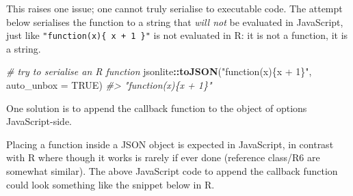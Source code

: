 \documentclass[
  10pt,
]{krantz}
\makeatletter
\newenvironment{Shaded}{\begin{snugshade}}{\end{snugshade}}
\newcommand{\CommentTok}[1]{\textcolor[rgb]{0.37,0.37,0.37}{\textit{#1}}}
\newcommand{\ControlFlowTok}[1]{\textcolor[rgb]{0.27,0.27,0.27}{\textbf{#1}}}
\newcommand{\DataTypeTok}[1]{\textcolor[rgb]{0.27,0.27,0.27}{#1}}
\newcommand{\KeywordTok}[1]{\textcolor[rgb]{0.27,0.27,0.27}{\textbf{#1}}}
\newcommand{\NormalTok}[1]{#1}
\newcommand{\OperatorTok}[1]{\textcolor[rgb]{0.43,0.43,0.43}{\textbf{#1}}}
\newcommand{\OtherTok}[1]{\textcolor[rgb]{0.37,0.37,0.37}{#1}}
\newcommand{\StringTok}[1]{\textcolor[rgb]{0.5,0.5,0.5}{#1}}
\newenvironment{kframe}{%
\medskip{}
\setlength{\fboxsep}{.8em}
 \def\at@end@of@kframe{}%
 \ifinner\ifhmode%
  \def\at@end@of@kframe{\end{minipage}}%
  \begin{minipage}{\columnwidth}%
 \fi\fi%
 \def\FrameCommand##1{\hskip\@totalleftmargin \hskip-\fboxsep
 \colorbox{shadecolor}{##1}\hskip-\fboxsep
     \hskip-\linewidth \hskip-\@totalleftmargin \hskip\columnwidth}%
 \MakeFramed {\advance\hsize-\width
   \@totalleftmargin\z@ \linewidth\hsize
   \@setminipage}}%
 {\par\unskip\endMakeFramed%
 \at@end@of@kframe}
\renewenvironment{Shaded}{\begin{kframe}}{\end{kframe}}
\makeatother
\begin{document}
This raises one issue; one cannot truly serialise to executable code. The attempt below serialises the function to a string that \emph{will not} be evaluated in JavaScript, just like \texttt{"function(x)\{\ x\ +\ 1\ \}"} is not evaluated in R: it is not a function, it is a string.

\begin{Shaded}
\begin{Highlighting}[]
\CommentTok{\# try to serialise an R function}
\NormalTok{jsonlite}\OperatorTok{::}\KeywordTok{toJSON}\NormalTok{(}\StringTok{"function(x)\{x + 1\}"}\NormalTok{, }\DataTypeTok{auto\_unbox =} \OtherTok{TRUE}\NormalTok{)}
\CommentTok{\#> "function(x)\{x + 1\}"}
\end{Highlighting}
\end{Shaded}

One solution is to append the callback function to the object of options JavaScript-side.

\begin{Shaded}
\end{Shaded}

Placing a function inside a JSON object is expected in JavaScript, in contrast with R where though it works is rarely if ever done (reference class/R6 are somewhat similar). The above JavaScript code to append the callback function could look something like the snippet below in R.

\begin{Shaded}
\end{Shaded}
\end{document}
